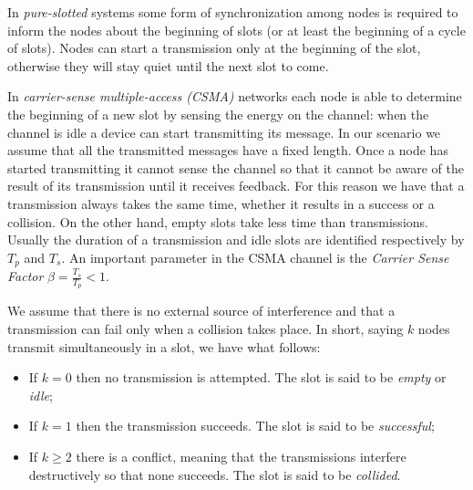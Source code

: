 \documentclass[12pt,a4paper]{report}
\newcommand{\rev}[1]{\textcolor{Cerulean}{#1}}
\begin{document}
\rev{
In \emph{pure-slotted} systems some form of synchronization among nodes is required to inform the nodes about the beginning of slots (or at least the beginning of a cycle of slots). Nodes can start a transmission only at the beginning of the slot, otherwise they will stay quiet until the next slot to come.\\}

\rev{
In \emph{carrier-sense multiple-access (CSMA)} networks each node is able to determine the beginning of a new slot by sensing the energy on the channel: when the channel is idle a device can start transmitting its message. In our scenario we assume that all the transmitted messages have a fixed length. Once a node has started transmitting it cannot sense the channel so that it cannot be aware of the result of its transmission until it receives feedback. For this reason we have that a transmission always takes the same time, whether it results in a success or a collision. On the other hand, empty slots take less time than transmissions. Usually the duration of a transmission and idle slots are identified respectively by $T_{p}$ and $T_{s}$. An important parameter in the CSMA channel is the \emph{Carrier Sense Factor} $\beta={\displaystyle\frac{T_{s}}{T_{p}}<1}$.\\}

We assume that there is no external source of interference and that a transmission can fail only when a collision takes place.
In short, saying $k$ nodes transmit simultaneously in a slot, we have what follows:
\begin{itemize}
\item If $k=0$ then no transmission is attempted. The slot is said to be \emph{empty} or \emph{idle};
\item If $k=1$ then the transmission succeeds. The slot is said to be \emph{successful};
\item If $k\geq 2$ there is a conflict, meaning that the transmissions interfere destructively so that none succeeds. The slot is said to be \emph{collided}.\\
\end{itemize}
\end{document}
